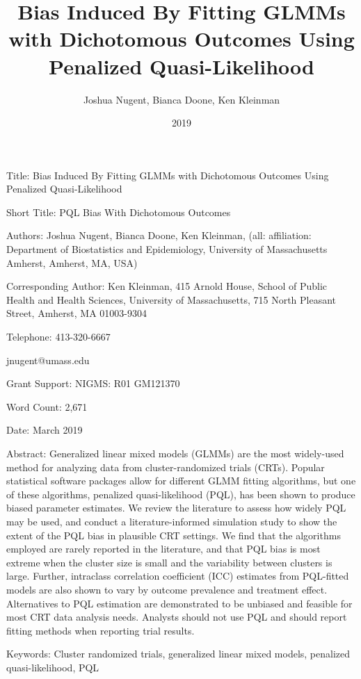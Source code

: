 \documentclass{article}
\begin{document}
\title{Bias Induced By Fitting GLMMs with Dichotomous Outcomes Using Penalized Quasi-Likelihood}
\author{Joshua Nugent, Bianca Doone, Ken Kleinman}
\date{2019}


Title: Bias Induced By Fitting GLMMs with Dichotomous Outcomes Using Penalized Quasi-Likelihood

Short Title: PQL Bias With Dichotomous Outcomes

Authors: Joshua Nugent, Bianca Doone, Ken Kleinman, (all: affiliation: Department of Biostatistics and Epidemiology, University of Massachusetts Amherst, Amherst, MA, USA)

Corresponding Author:
Ken Kleinman, 415 Arnold House, School of Public Health and Health Sciences, University of Massachusetts, 715 North Pleasant Street, Amherst, MA 01003-9304

Telephone: 413-320-6667

jnugent@umass.edu

Grant Support: NIGMS: R01 GM121370

Word Count: 2,671

Date: March 2019

\newpage

Abstract: Generalized linear mixed models (GLMMs) are the most widely-used method for analyzing data from cluster-randomized trials (CRTs). Popular statistical software packages allow for different GLMM fitting algorithms, but one of these algorithms, penalized quasi-likelihood (PQL), has been shown to produce biased parameter estimates. We review the literature to assess how widely PQL may be used, and conduct a literature-informed simulation study to show the extent of the PQL bias in plausible CRT settings. We find that the algorithms employed are rarely reported in the literature, and that PQL bias is most extreme when the cluster size is small and the variability between clusters is large. Further, intraclass correlation coefficient (ICC) estimates from PQL-fitted models are also shown to vary by outcome prevalence and treatment effect. Alternatives to PQL estimation are demonstrated to be unbiased and feasible for most CRT data analysis needs.  Analysts should not use PQL and should report fitting methods when reporting trial results.


Keywords: Cluster randomized trials, generalized linear mixed models, penalized quasi-likelihood, PQL
\end{document}

